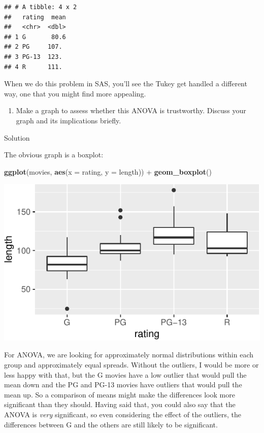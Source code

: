 \documentclass[]{tufte-book}
\newenvironment{Shaded}{}{}
\newcommand{\DataTypeTok}[1]{\textcolor[rgb]{0.56,0.13,0.00}{#1}}
\newcommand{\KeywordTok}[1]{\textcolor[rgb]{0.00,0.44,0.13}{\textbf{#1}}}
\newcommand{\NormalTok}[1]{#1}
\newcommand{\OperatorTok}[1]{\textcolor[rgb]{0.40,0.40,0.40}{#1}}
\newcommand{\StringTok}[1]{\textcolor[rgb]{0.25,0.44,0.63}{#1}}
\providecommand{\tightlist}{%
  \setlength{\itemsep}{0pt}\setlength{\parskip}{0pt}}
\theoremstyle{definition}
\theoremstyle{definition}
\theoremstyle{definition}
\theoremstyle{remark}
\begin{document}
\begin{verbatim}
## # A tibble: 4 x 2
##   rating  mean
##   <chr>  <dbl>
## 1 G       80.6
## 2 PG     107. 
## 3 PG-13  123. 
## 4 R      111.
\end{verbatim}

When we do this problem in SAS, you'll see the Tukey get handled a
different way, one that you might find more appealing.

\begin{enumerate}
\def\labelenumi{(\alph{enumi})}
\setcounter{enumi}{3}
\tightlist
\item
  Make a graph to assess whether this ANOVA is trustworthy. Discuss your
  graph and its implications briefly.
\end{enumerate}

Solution

The obvious graph is a boxplot:

\begin{Shaded}
\begin{Highlighting}[]
\KeywordTok{ggplot}\NormalTok{(movies, }\KeywordTok{aes}\NormalTok{(}\DataTypeTok{x =}\NormalTok{ rating, }\DataTypeTok{y =}\NormalTok{ length)) }\OperatorTok{+}\StringTok{ }
\StringTok{    }\KeywordTok{geom_boxplot}\NormalTok{()}
\end{Highlighting}
\end{Shaded}

\includegraphics{10-analysis-of-variance_files/figure-latex/unnamed-chunk-7-1}

For ANOVA, we are looking for approximately normal distributions within
each group and approximately equal spreads. Without the outliers, I
would be more or less happy with that, but the G movies have a low
outlier that would pull the mean down and the PG and PG-13 movies have
outliers that would pull the mean up. So a comparison of means might
make the differences look more significant than they should. Having said
that, you could also say that the ANOVA is \emph{very} significant, so
even considering the effect of the outliers, the differences between G
and the others are still likely to be significant.
\end{document}
